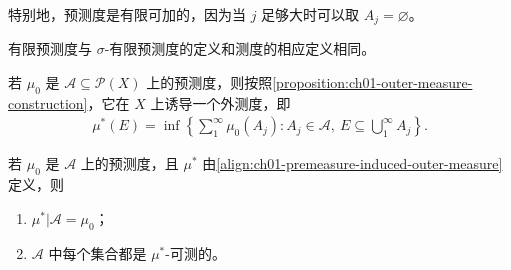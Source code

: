 \documentclass[../../main.tex]{subfiles}%
\begin{document}
\begin{remark}
特别地，预测度是有限可加的，因为当 $j$ 足够大时可以取 $A_j=\varnothing$。
\end{remark}

\begin{definition}\label{definition:ch01-finite-premeasure}
有限预测度与 $\sigma$-有限预测度的定义和测度的相应定义相同。
\end{definition}

若 $\mu_0$ 是 $\mathscr{A}\subseteq\mathscr{P}(X)$ 上的预测度，则按照\cref{proposition:ch01-outer-measure-construction}，它在 $X$ 上诱导一个外测度，即
\begin{align}\label{align:ch01-premeasure-induced-outer-measure}
\mu^*(E)=\inf\left\{\sum_1^\infty\mu_0(A_j):A_j\in\mathscr{A},\ E\subseteq\bigcup_1^\infty A_j\right\}.
\end{align}

\begin{proposition}\label{proposition:ch01-premeasure-outer-measure-properties}
若 $\mu_0$ 是 $\mathscr{A}$ 上的预测度，且 $\mu^*$ 由\eqref{align:ch01-premeasure-induced-outer-measure}定义，则
\begin{enumerate}[label=\alph*.,ref=(\alph*)]
\item\label{item:ch01-premeasure-restriction} $\mu^*|\mathscr{A}=\mu_0$；
\item\label{item:ch01-premeasure-measurable} $\mathscr{A}$ 中每个集合都是 $\mu^*$-可测的。
\end{enumerate}
\end{proposition}
\end{document}
